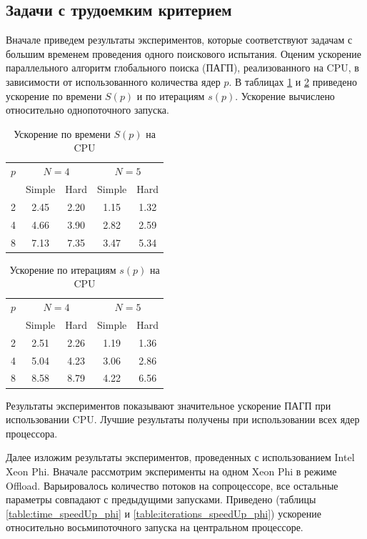 \subsection{Задачи с трудоемким критерием}
Вначале приведем результаты экспериментов, которые соответствуют задачам с большим временем проведения одного поискового испытания. Оценим ускорение параллельного алгоритм глобального поиска (ПАГП), реализованного на CPU, в зависимости от использованного количества ядер \(p\). В таблицах \ref{table:time_speedUp_cpu} и \ref{table:iterations_speedUp_cpu} приведено ускорение по времени \(S(p)\) и по итерациям \(s(p)\). Ускорение вычислено относительно однопоточного запуска.
\begin{table}
    \centering
    \begin{tabular}{|c|c|c|c|c|}
    \hline
    \(p\) & \multicolumn{2}{|c|}{\(N=4\)} & \multicolumn{2}{|c|}{\(N=5\)}\\ \cline{2-5}
    & Simple & Hard & Simple & Hard \\ \hline
    2 & 2.45 & 2.20 & 1.15 & 1.32\\ \hline
	4 & 4.66 & 3.90 & 2.82 & 2.59\\ \hline
	8 & 7.13 & 7.35 & 3.47 & 5.34\\ \hline
    \end{tabular}
    \caption{Ускорение по времени \(S(p)\) на CPU}
    \label{table:time_speedUp_cpu}
\end{table}
\begin{table}
    \centering
    \begin{tabular}{|c|c|c|c|c|}
    \hline
    \(p\) & \multicolumn{2}{|c|}{\(N=4\)} & \multicolumn{2}{|c|}{\(N=5\)}\\ \cline{2-5}
    & Simple & Hard & Simple & Hard \\ \hline
	2 & 2.51 & 2.26 & 1.19 & 1.36\\ \hline
	4 & 5.04 & 4.23 & 3.06 & 2.86\\ \hline
	8 & 8.58 & 8.79 & 4.22 & 6.56\\ \hline
    \end{tabular}
    \caption{Ускорение по итерациям \(s(p)\) на CPU}
    \label{table:iterations_speedUp_cpu}
\end{table}
\par
Результаты экспериментов показывают значительное ускорение ПАГП при использовании CPU. Лучшие результаты получены при использовании всех ядер процессора.
\par
Далее изложим результаты экспериментов, проведенных с использованием Intel Xeon Phi. Вначале рассмотрим эксперименты на одном Xeon Phi в режиме Offload. Варьировалось количество потоков на сопроцессоре, все остальные параметры совпадают с предыдущими запусками. Приведено (таблицы \ref{table:time_speedUp_phi} и \ref{table:iterations_speedUp_phi}) ускорение относительно восьмипоточного запуска на центральном процессоре.
